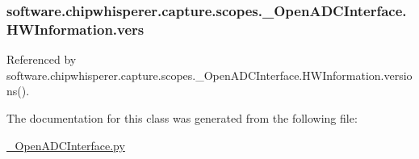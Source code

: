 \subsubsection[{vers}]{\setlength{\rightskip}{0pt plus 5cm}software.\+chipwhisperer.\+capture.\+scopes.\+\_\+\+Open\+A\+D\+C\+Interface.\+H\+W\+Information.\+vers}\label{classsoftware_1_1chipwhisperer_1_1capture_1_1scopes_1_1__OpenADCInterface_1_1HWInformation_ad302158b36d83a818672a6d53768214c}


Referenced by software.\+chipwhisperer.\+capture.\+scopes.\+\_\+\+Open\+A\+D\+C\+Interface.\+H\+W\+Information.\+versions().



The documentation for this class was generated from the following file\+:\begin{DoxyCompactItemize}
\item 
\hyperlink{__OpenADCInterface_8py}{\+\_\+\+Open\+A\+D\+C\+Interface.\+py}\end{DoxyCompactItemize}
